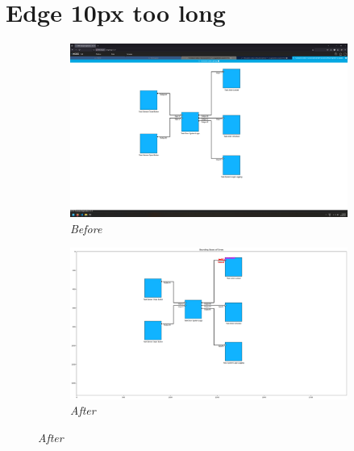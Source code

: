 \documentclass{article}
\begin{document}
\section{Edge 10px too long}
\begin{figure}[H]
    \centering
    \begin{subfigure}[t]{0.9\textwidth}
        \centering
        \includegraphics[width=\textwidth]{testcases/edge_10px_too_long/145613-303058_input_image.png}
        \caption*{\textit{Before}}
    \end{subfigure}
    \newline    
    \begin{subfigure}[t]{0.9\textwidth}
        \centering
        \includegraphics[width=\textwidth]{testcases/edge_10px_too_long/145632-779481_element_bbox_errors_labeled_colored.png}
        \caption*{\textit{After}}
    \end{subfigure}
    \label{fig:edge_too_long_10}
\end{figure}
\newpage
\end{document}
